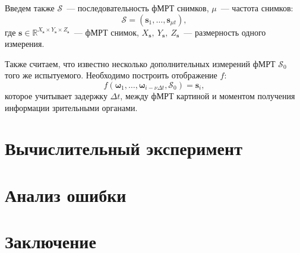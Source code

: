\documentclass[12pt,twoside]{article}
\begin{document}
Введем также $\mathcal{S}$~--- последовательность фМРТ снимков,  $\mu$~--- частота снимков:
\begin{equation}
    \mathcal{S} = (\bm{s}_{1}, \dots, \bm{s}_{\mu t}),
\end{equation}
где $\bm{s} \in \mathbb{R}^{X_{\bm{s}} \times Y_{\bm{s}} \times Z_{\bm{s}}}$~--- фМРТ снимок, $X_{\bm{s}},~Y_{\bm{s}},~Z_{\bm{s}}$~--- размерность одного измерения.

Также считаем, что известно несколько дополнительных измерений фМРТ $\mathcal{S}_0$ того же испытуемого.
Необходимо построить отображение $f$:
\begin{equation}
    f(\bm{\omega}_{1}, \dots, \bm{\omega}_{i - \nu \Delta t}, \mathcal{S}_0) = \bm{s}_i, 
\end{equation}
которое учитывает задержку $\Delta t$, между фМРТ картиной и моментом получения информации зрительными органами.
\section{Вычислительный эксперимент}


\section{Анализ ошибки}

\section{Заключение}









\end{document}
